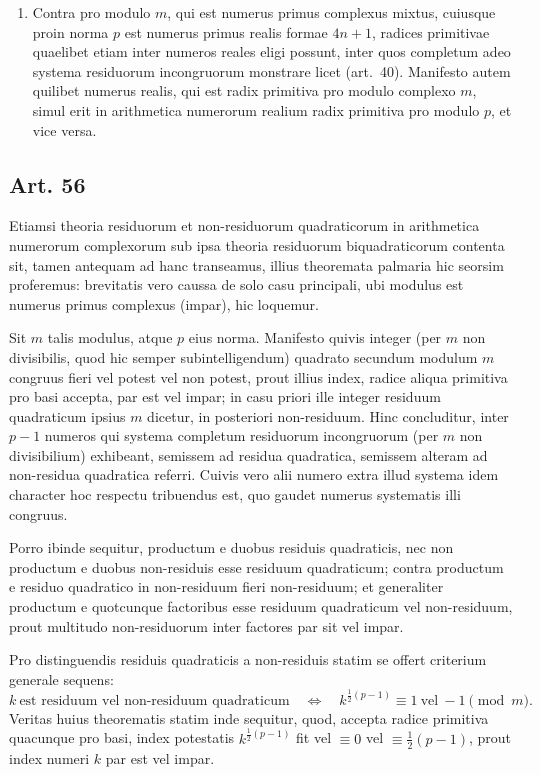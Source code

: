 \documentclass[12pt]{article}
\newcommand{\art}[1]{\subsection*{Art. #1}}
\begin{document}
\begin{enumerate}[label=\Roman*.]
\item Contra pro modulo $m$, qui est numerus primus complexus mixtus, cuiusque proin norma $p$ est numerus primus realis formae $4n+1$, radices primitivae quaelibet etiam inter numeros reales eligi possunt, inter quos completum adeo systema residuorum incongruorum monstrare licet (art.~40). Manifesto autem quilibet numerus realis, qui est radix primitiva pro modulo complexo $m$, simul erit in arithmetica numerorum realium radix primitiva pro modulo $p$, et vice versa.
\end{enumerate}

\art{56}
Etiamsi theoria residuorum et non-residuorum quadraticorum in arithmetica numerorum complexorum sub ipsa theoria residuorum biquadraticorum contenta sit, tamen antequam ad hanc transeamus, illius theoremata palmaria hic seorsim proferemus: brevitatis vero caussa de solo casu principali, ubi modulus est numerus primus complexus (impar), hic loquemur.

Sit $m$ talis modulus, atque $p$ eius norma. Manifesto quivis integer (per $m$ non divisibilis, quod hic semper subintelligendum) quadrato secundum modulum $m$ congruus fieri vel potest vel non potest, prout illius index, radice aliqua primitiva pro basi accepta, par est vel impar; in casu priori ille integer residuum quadraticum ipsius $m$ dicetur, in posteriori non-residuum. Hinc concluditur, inter $p-1$ numeros qui systema completum residuorum incongruorum (per $m$ non divisibilium) exhibeant, semissem ad residua quadratica, semissem alteram ad non-residua quadratica referri. Cuivis vero alii numero extra illud systema idem character hoc respectu tribuendus est, quo gaudet numerus systematis illi congruus.

Porro ibinde sequitur, productum e duobus residuis quadraticis, nec non productum e duobus non-residuis esse residuum quadraticum; contra productum e residuo quadratico in non-residuum fieri non-residuum; et generaliter productum e quotcunque factoribus esse residuum quadraticum vel non-residuum, prout multitudo non-residuorum inter factores par sit vel impar.

Pro distinguendis residuis quadraticis a non-residuis statim se offert criterium generale sequens:
\[
 k\ \text{est residuum vel non-residuum quadraticum}\quad
 \Longleftrightarrow\quad
 k^{\frac12(p-1)}\equiv 1\ \text{vel}\ -1\pmod m.
\]
Veritas huius theorematis statim inde sequitur, quod, accepta radice primitiva quacunque pro basi, index potestatis $k^{\frac12(p-1)}$ fit vel $\equiv0$ vel $\equiv\frac12(p-1)$, prout index numeri $k$ par est vel impar.
\end{document}

